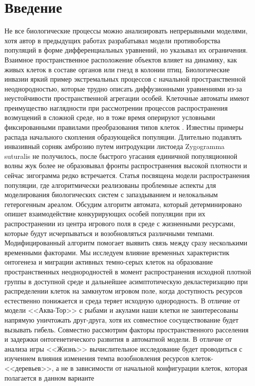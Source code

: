 \documentclass[a4paper,11pt,twoside]{article}
\begin{document}

\section*{Введение}

Не все биологические процессы можно анализировать непрерывными моделями, хотя автор в предыдущих работах разрабатывал модели противоборства популяций в форме дифференциальных уравнений, но указывал их ограничения. Взаимное пространственное расположение объектов влияет на динамику, как живых клеток в составе органов или гнезд в колонии птиц. Биологические инвазии яркий пример экстремальных процессов с начальной пространственной неоднородностью, которые трудно описать диффузионными уравнениями из-за неустойчивости пространственной агрегации особей. Клеточные автоматы имеют преимущество наглядности при рассмотрении процессов распространения возмущений в сложной среде, но в тоже время оперируют условными фиксированными правилами преобразования типов клеток \cite{Kalm}. Известны примеры распада начального скопления образующейся популяции.  Длительно подавлять инвазивный сорняк амброзию путем интродукции листоеда Zygogramma suturalis \cite{Koval} не получилось, после быстрого угасания единичной популяционной волны жук более не образовывал фронты распространения высокой плотности и сейчас зигограмма редко встречается. Статья посвящена модели распространения популяции, где алгоритмически реализованы проблемные аспекты для моделирования биологических систем с запаздыванием и нелокальным гетерогенным ареалом.  Обсудим алгоритм автомата, который детерминировано опишет взаимодействие конкурирующих особей популяции  при их распространении из центра игрового поля в среде с жизненными ресурсами, которые будут исчерпываться и возобновляться различными темпами. Модифицированный алгоритм помогает выявить связь между сразу несколькими временными факторами. Мы исследуем влияние временных характеристик онтогенеза и миграции активных темно-серых клеток на образование пространственных неоднородностей в момент распространения исходной плотной группы в доступной среде и дальнейшее асимптотическую декластеризацию при распределении клеток на замкнутом игровом поле, когда доступность ресурсов естественно понижается и среда теряет исходную однородность.  В отличие от модели <<Аква-Тор>> с рыбами и акулами наши клетки не заинтересованы напрямую уничтожать друг-друга, хотя их совместное сосуществование будет вызывать гибель. Совместно рассмотрим факторы пространственного расселения и задержки онтогенетического развития в автоматной модели.  В отличие от анализа игры <<Жизнь>> вычислительное исследование будет проводиться с изучением влияния изменения темпа возобновления ресурсов клеток-<<деревьев>>, а не в зависимости от начальной конфигурации клеток, которая полагается в данном варианте 
\end{document}
